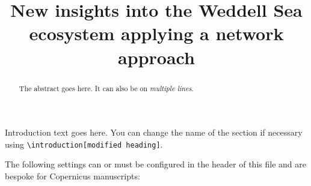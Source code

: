 \documentclass[gc, manuscript]{copernicus}
\begin{document}
\title{New insights into the Weddell Sea ecosystem applying a network
approach}









\received{}
\pubdiscuss{} %
\revised{}
\accepted{}
\published{}




\maketitle


\begin{abstract}
The abstract goes here. It can also be on \emph{multiple lines}.
\end{abstract}




\introduction[Introduction]

Introduction text goes here. You can change the name of the section if
necessary using
\texttt{\textbackslash{}introduction{[}modified\ heading{]}}.

The following settings can or must be configured in the header of this
file and are bespoke for Copernicus manuscripts:
\end{document}
